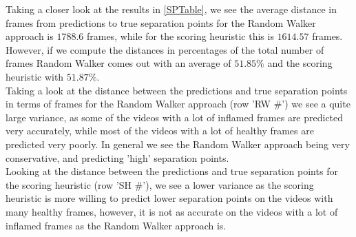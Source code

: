 \begin{table}[H]
	\label{SPTable}
\end{table}
Taking a closer look at the results in \autoref{SPTable}, we see the average distance in frames from predictions to true separation points for the Random Walker approach is $1788.6$ frames, while for the scoring heuristic this is $1614.57$ frames. However, if we compute the distances in percentages of the total number of frames Random Walker comes out with an average of $51.85\%$ and the scoring heuristic with $51.87\%$.\\
Taking a look at the distance between the predictions and true separation points in terms of frames for the Random Walker approach (row 'RW \#') we see a quite large variance, as some of the videos with a lot of inflamed frames are predicted very accurately, while most of the videos with a lot of healthy frames are predicted very poorly. In general we see the Random Walker approach being very conservative, and predicting 'high' separation points.\\
Looking at the distance between the predictions and true separation points for the scoring heuristic (row 'SH \#'), we see a lower variance as the scoring heuristic is more willing to predict lower separation points on the videos with many healthy frames, however, it is not as accurate on the videos with a lot of inflamed frames as the Random Walker approach is.